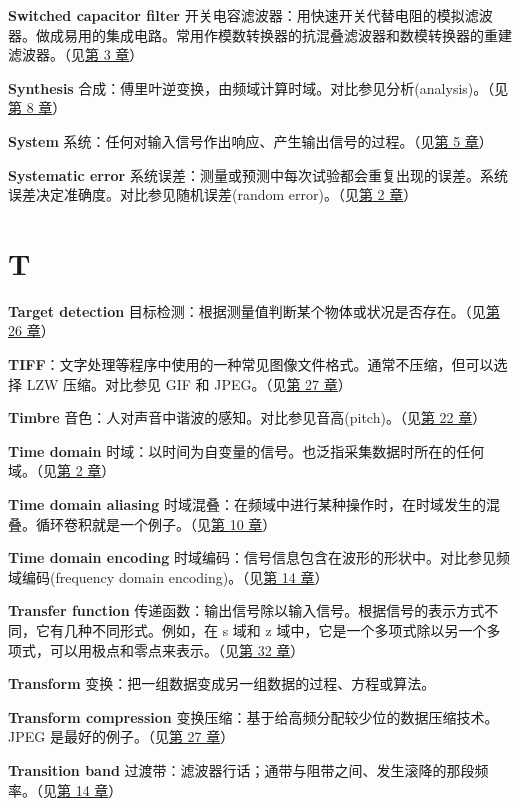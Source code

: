 \textbf{Switched capacitor filter}
开关电容滤波器：用快速开关代替电阻的模拟滤波器。做成易用的集成电路。常用作模数转换器的抗混叠滤波器和数模转换器的重建滤波器。（见\hyperref[ch-03]{第
3 章}）

\textbf{Synthesis}
合成：傅里叶逆变换，由频域计算时域。对比参见分析(analysis)。（见\hyperref[ch-08]{第
8 章}）

\textbf{System}
系统：任何对输入信号作出响应、产生输出信号的过程。（见\hyperref[ch-05]{第
5 章}）

\textbf{Systematic error}
系统误差：测量或预测中每次试验都会重复出现的误差。系统误差决定准确度。对比参见随机误差(random
error)。（见\hyperref[ch-02]{第 2 章}）

\section{T}

\textbf{Target detection}
目标检测：根据测量值判断某个物体或状况是否存在。（见\hyperref[ch-26]{第
26 章}）

\textbf{TIFF}：文字处理等程序中使用的一种常见图像文件格式。通常不压缩，但可以选择
LZW 压缩。对比参见 GIF 和 JPEG。（见\hyperref[ch-27]{第 27 章}）

\textbf{Timbre}
音色：人对声音中谐波的感知。对比参见音高(pitch)。（见\hyperref[ch-22]{第
22 章}）

\textbf{Time domain}
时域：以时间为自变量的信号。也泛指采集数据时所在的任何域。（见\hyperref[ch-02]{第
2 章}）

\textbf{Time domain aliasing}
时域混叠：在频域中进行某种操作时，在时域发生的混叠。循环卷积就是一个例子。（见\hyperref[ch-10]{第
10 章}）

\textbf{Time domain encoding}
时域编码：信号信息包含在波形的形状中。对比参见频域编码(frequency domain
encoding)。（见\hyperref[ch-14]{第 14 章}）

\textbf{Transfer function}
传递函数：输出信号除以输入信号。根据信号的表示方式不同，它有几种不同形式。例如，在
s 域和 z
域中，它是一个多项式除以另一个多项式，可以用极点和零点来表示。（见\hyperref[ch-32]{第
32 章}）

\textbf{Transform} 变换：把一组数据变成另一组数据的过程、方程或算法。

\textbf{Transform compression}
变换压缩：基于给高频分配较少位的数据压缩技术。JPEG
是最好的例子。（见\hyperref[ch-27]{第 27 章}）

\textbf{Transition band}
过渡带：滤波器行话；通带与阻带之间、发生滚降的那段频率。（见\hyperref[ch-14]{第
14 章}）

